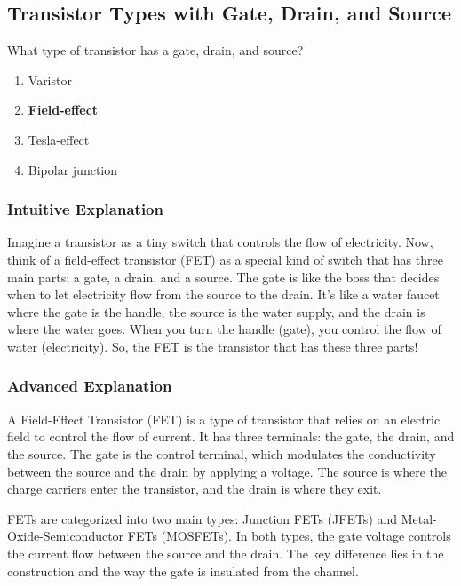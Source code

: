 \subsection{Transistor Types with Gate, Drain, and Source}
\label{T6B05}

\begin{tcolorbox}[colback=gray!10!white,colframe=black!75!black,title=T6B05]
What type of transistor has a gate, drain, and source?
\begin{enumerate}[label=\Alph*)]
    \item Varistor
    \item \textbf{Field-effect}
    \item Tesla-effect
    \item Bipolar junction
\end{enumerate}
\end{tcolorbox}

\subsubsection{Intuitive Explanation}
Imagine a transistor as a tiny switch that controls the flow of electricity. Now, think of a field-effect transistor (FET) as a special kind of switch that has three main parts: a gate, a drain, and a source. The gate is like the boss that decides when to let electricity flow from the source to the drain. It’s like a water faucet where the gate is the handle, the source is the water supply, and the drain is where the water goes. When you turn the handle (gate), you control the flow of water (electricity). So, the FET is the transistor that has these three parts!

\subsubsection{Advanced Explanation}
A Field-Effect Transistor (FET) is a type of transistor that relies on an electric field to control the flow of current. It has three terminals: the gate, the drain, and the source. The gate is the control terminal, which modulates the conductivity between the source and the drain by applying a voltage. The source is where the charge carriers enter the transistor, and the drain is where they exit.

FETs are categorized into two main types: Junction FETs (JFETs) and Metal-Oxide-Semiconductor FETs (MOSFETs). In both types, the gate voltage controls the current flow between the source and the drain. The key difference lies in the construction and the way the gate is insulated from the channel.

